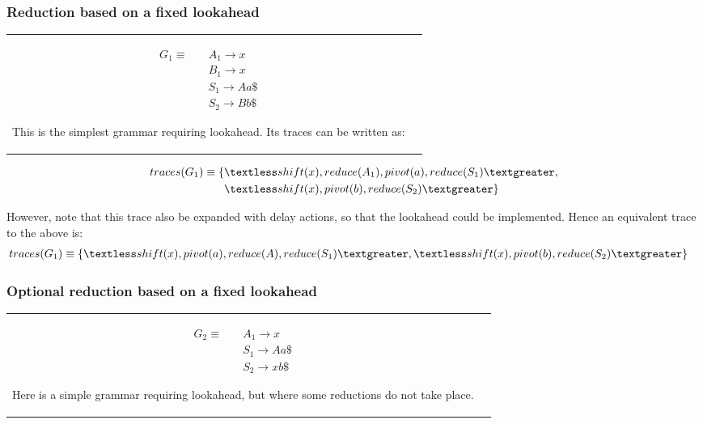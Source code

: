 \documentclass[11pt]{article}
\newenvironment{grammar}{\begin{align*}}{\end{align*}}
\begin{document}
\subsubsection{Reduction based on a fixed lookahead}
\begin{tabular}[t]{cl}
\parbox{.3\textwidth}{
\begin{align*}
G_1 \equiv \quad & A_1 \rightarrow x\\
                 & B_1 \rightarrow x\\
                 & S_1 \rightarrow A a \$\\
                 & S_2 \rightarrow B b \$
\end{align*}}
\parbox{.8\textwidth}{This is the simplest grammar requiring lookahead. Its traces can be written as:}
\end{tabular}

\begin{align*}
traces(G_1) \equiv \{ & \textless shift(x), reduce(A_1), pivot(a), reduce(S_1) \textgreater,\\
                      & \textless shift(x), pivot(b), reduce(S_2) \textgreater \}
\end{align*}

However, note that this trace also be expanded with delay actions, so that the lookahead could be implemented. Hence an equivalent trace to the above is:
\begin{align*}
traces(G_1) \equiv \{ & \textless shift(x), pivot(a), reduce(A), reduce(S_1) \textgreater, \textless shift(x), pivot(b), reduce(S_2) \textgreater \}
\end{align*}

\subsubsection{Optional reduction based on a fixed lookahead}
\begin{tabular}[t]{cl}
\parbox{.3\textwidth}{
\begin{align*}
G_2 \equiv \quad & A_1 \rightarrow x\\
                 & S_1 \rightarrow A a \$\\
                 & S_2 \rightarrow x b \$
\end{align*}}
\parbox{.8\textwidth}{Here is a simple grammar requiring lookahead, but where some reductions do not take place.}
\end{tabular}
\end{document}
